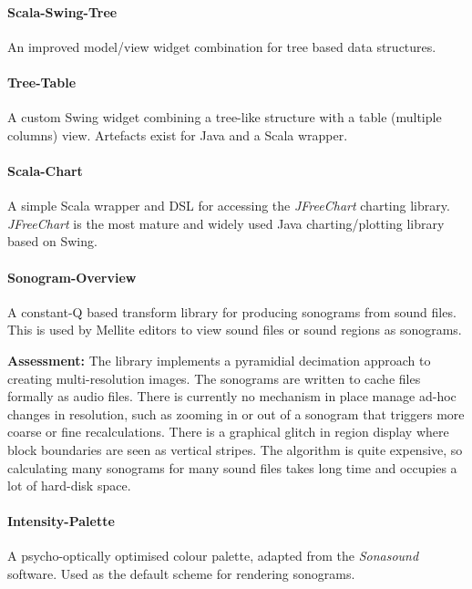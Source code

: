 \documentclass[11pt,a4paper]{article}
\newcommand{\software}[1]{\textit{#1}}
\begin{document}
\paragraph{Scala-Swing-Tree}

An improved model/view widget combination for tree based data structures.

\paragraph{Tree-Table}

A custom Swing widget combining a tree-like structure with a table (multiple columns) view. Artefacts exist for Java and a Scala wrapper.

\paragraph{Scala-Chart}

A simple Scala wrapper and DSL for accessing the \software{JFreeChart} charting library. \software{JFreeChart} is the most mature and widely used Java charting/plotting library based on Swing.

\paragraph{Sonogram-Overview}

A constant-Q based transform library for producing sonograms from sound files. This is used by Mellite editors to view sound files or sound regions as sonograms.

\textbf{Assessment:} The library implements a pyramidial decimation approach to creating multi-resolution images. The sonograms are written to cache files formally as audio files. There is currently no mechanism in place manage ad-hoc changes in resolution, such as zooming in or out of a sonogram that triggers more coarse or fine recalculations. There is a graphical glitch in region display where block boundaries are seen as vertical stripes. The algorithm is quite expensive, so calculating many sonograms for many sound files takes long time and occupies a lot of hard-disk space.

\paragraph{Intensity-Palette}

A psycho-optically optimised colour palette, adapted from the \software{Sonasound} software. Used as the default scheme for rendering sonograms.
\end{document}
